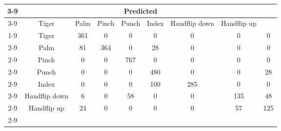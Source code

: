 \documentclass{standalone}
\begin{document}
 
 \begin{tabular}{|c |c |c |c |c |c |c |c |c |}
\cline{3-9}\multicolumn{2}{c|}{} & \multicolumn{7}{c|}{Predicted} \\ 
\cline{3-9} \multicolumn{2}{c |}{ } & Tiger & Palm & Pinch & Punch & Index & Handflip down & Handflip up\\ 
\cline{1-9}\multirow{7}{*}{\rotatebox[origin=c]{90}{Actual}} & Tiger & 361 & 0 & 0 & 0 & 0 & 0 & 0\\ 
 \cline{2-9} & Palm & 81 & 364 & 0 & 28 & 0 & 0 & 0\\ 
 \cline{2-9} & Pinch & 0 & 0 & 767 & 0 & 0 & 0 & 0\\ 
 \cline{2-9} & Punch & 0 & 0 & 0 & 480 & 0 & 0 & 28\\ 
 \cline{2-9} & Index & 0 & 0 & 0 & 100 & 285 & 0 & 0\\ 
 \cline{2-9} & Handflip down & 6 & 0 & 58 & 0 & 0 & 135 & 48\\ 
 \cline{2-9} & Handflip up & 24 & 0 & 0 & 0 & 0 & 57 & 125\\ 
 \cline{2-9}\hline \end{tabular}
 
\end{document}
